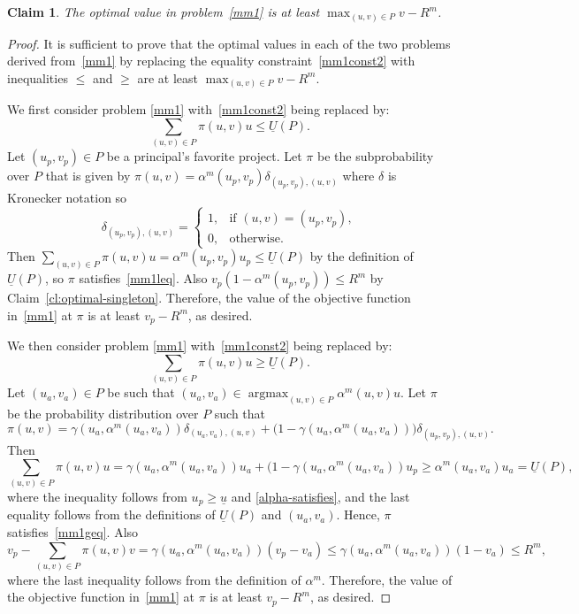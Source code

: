 \documentclass[12pt,english]{article}
\DeclareMathOperator*{\argmax}{argmax}
\newcommand{\underU}{{\underline{U}}}
\newcommand{\underu}{{\underline{u}}}
\newcommand{\eran}[1]{\begin{framed}{\noindent {\bf Eran:} #1}\end{framed}}
\theoremstyle{remark}
\theoremstyle{plain}
\newtheorem{claim}[theorem]{Claim}
\theoremstyle{definition}
\begin{document}
\begin{claim}\label{cl:optimal}The optimal value in problem~\eqref{mm1} is at least $\max_{(u,v)\in P}v-R^m$.
\end{claim}
\begin{proof}It is sufficient to prove that the optimal values in each of the two problems derived from~\eqref{mm1} by replacing the equality constraint~\eqref{mm1const2} with inequalities $\leqslant$ and $\geqslant$ are  at least  $\max_{(u,v)\in P}v-R^m$. 

We first consider problem \eqref{mm1} with~\eqref{mm1const2} being replaced by: 
\begin{equation}\label{mm1leq}\sum_{(u,v)\in P}\pi(u,v)u\leqslant\underU(P).\end{equation}
Let $(u_p,v_p)\in P$ be a principal's favorite project. Let $\pi$ be the subprobability over $P$ that is given by $\pi(u,v)=\alpha^m(u_p,v_p)\delta_{(u_p,v_p),(u,v)}$
 where $\delta$ is Kronecker notation so \[\delta_{(u_p,v_p),(u,v)}=\begin{cases}1, &\text{if }(u,v)=(u_p,v_p),\\0, &\text{otherwise.}\end{cases}\]
Then $\sum_{(u,v)\in P}\pi(u,v)u=\alpha^m(u_p,v_p)u_p\leqslant \underU(P)$ by the definition of $\underU(P)$,  so $\pi$ satisfies~\eqref{mm1leq}. Also $v_p(1-\alpha^m(u_p,v_p))\leqslant R^m$ by Claim~\ref{cl:optimal-singleton}. Therefore, the value of the objective function in~\eqref{mm1} at $\pi$ is at least $v_p -R^m$, as desired.

We then consider problem \eqref{mm1} with~\eqref{mm1const2} being replaced by: 
\begin{equation}\label{mm1geq}\sum_{(u,v)\in P}\pi(u,v)u\geqslant\underU(P).\end{equation}
Let $(u_a,v_a)\in P$ be such that $(u_a,v_a)\in\argmax_{(u,v)\in P} \alpha^m(u,v) u$. Let $\pi$ be the probability distribution over $P$ such that 
 \[\pi(u,v)=\gamma(u_a,\alpha^m(u_a,v_a))\delta_{(u_a,v_a),(u,v)}+\bigl(1-\gamma(u_a,\alpha^m(u_a,v_a))\bigr)\delta_{(u_p,v_p),(u,v)}.\]
Then  
\[\sum_{(u,v)\in P}\pi(u,v)u=\gamma(u_a,\alpha^m(u_a,v_a))u_a+(1-\gamma(u_a,\alpha^m(u_a,v_a))u_p \geqslant \alpha^m(u_a,v_a)u_a=\underU(P),\] where the inequality follows from $u_p\geqslant \underu$ and \eqref{alpha-satisfies}, and the last equality follows from the definitions of $\underU(P)$ and $(u_a,v_a)$. Hence, $\pi$ satisfies~\eqref{mm1geq}. Also
\[v_p-\sum_{(u,v)\in P}\pi(u,v)v=\gamma(u_a,\alpha^m(u_a,v_a))(v_p-v_a)\leqslant \gamma(u_a,\alpha^m(u_a,v_a))(1-v_a)\leqslant R^m,\]
where the last inequality follows from the definition of $\alpha^m$. Therefore, the value of the objective function in~\eqref{mm1} at $\pi$ is at least $v_p-R^m$, as desired.
\end{proof} 
\end{document}
